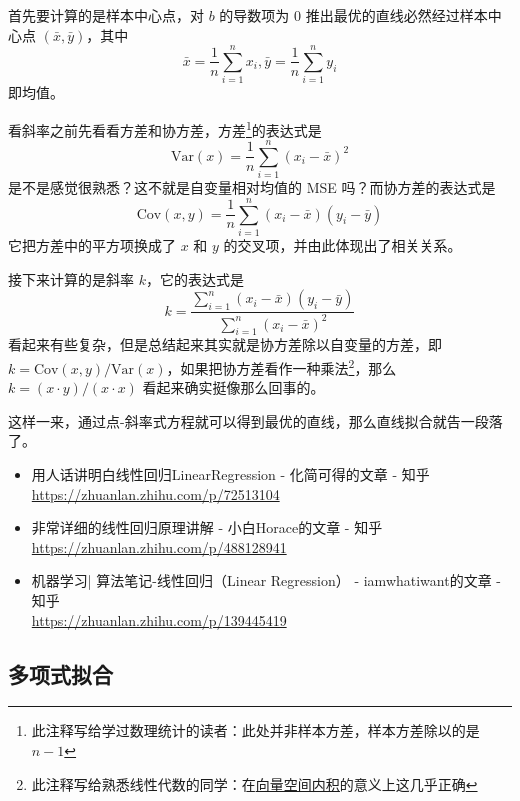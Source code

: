 \documentclass[UTF8, 12pt]{article}
\newcommand{\uhref}[2]{\href{#1}{\underline{#2}}}
\begin{document}
首先要计算的是样本中心点，对 $b$ 的导数项为 0 推出最优的直线必然经过样本中心点 $(\bar x, \bar y)$，其中
\[
    \bar x = \frac1n \sum_{i=1}^n x_i, \bar y = \frac1n \sum_{i=1}^n y_i
\]
即均值。

看斜率之前先看看方差和协方差，方差\footnote{此注释写给学过数理统计的读者：此处并非样本方差，样本方差除以的是 $n-1$}的表达式是
\[
    \text{Var}(x) = \frac1n \sum_{i=1}^n (x_i - \bar x)^2
\]
是不是感觉很熟悉？这不就是自变量相对均值的 MSE 吗？而协方差的表达式是
\[
    \text{Cov}(x, y) = \frac1n \sum_{i=1}^n (x_i - \bar x)(y_i - \bar y)
\]
它把方差中的平方项换成了 $x$ 和 $y$ 的交叉项，并由此体现出了相关关系。

接下来计算的是斜率 $k$，它的表达式是
\[
    k = \frac{\sum_{i=1}^n (x_i - \bar x)(y_i - \bar y)}{\sum_{i=1}^n (x_i - \bar x)^2}
\]
看起来有些复杂，但是总结起来其实就是协方差除以自变量的方差，即 $k = \text{Cov}(x, y) / \text{Var}(x)$，如果把协方差看作一种乘法\footnote{此注释写给熟悉线性代数的同学：在\uhref{https://en.wikipedia.org/wiki/Inner_product_space\#Random_variables}{向量空间内积}的意义上这几乎正确}，那么 $k = (x\cdot y) / (x\cdot x)$ 看起来确实挺像那么回事的。

这样一来，通过点-斜率式方程就可以得到最优的直线，那么直线拟合就告一段落了。

\begin{tcolorbox}[myrecommendbox, title=推荐阅读, breakable=false]
    \begin{itemize}
        \item 用人话讲明白线性回归LinearRegression - 化简可得的文章 - 知乎\\
              \url{https://zhuanlan.zhihu.com/p/72513104}
        \item 非常详细的线性回归原理讲解 - 小白Horace的文章 - 知乎\\
              \url{https://zhuanlan.zhihu.com/p/488128941}
        \item 机器学习| 算法笔记-线性回归（Linear Regression） - iamwhatiwant的文章 - 知乎\\
              \url{https://zhuanlan.zhihu.com/p/139445419}
    \end{itemize}
\end{tcolorbox}

\newpage

\subsection{多项式拟合}
\end{document}
